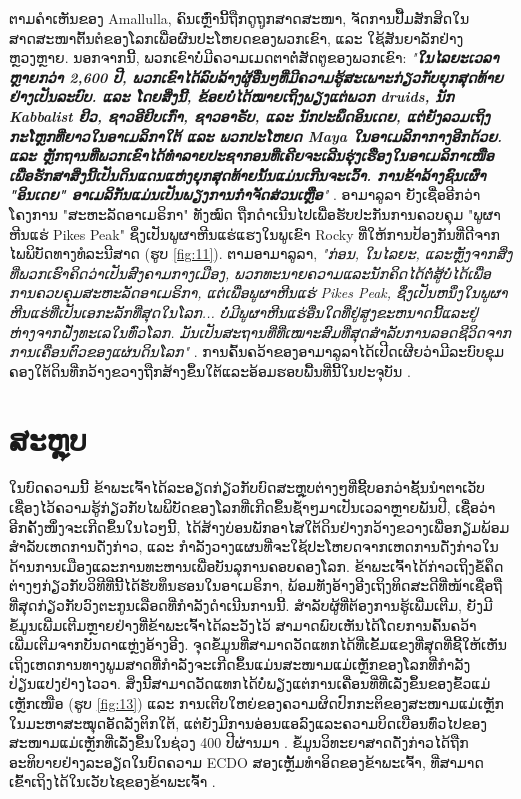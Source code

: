 \documentclass[10pt,twocolumn,letterpaper]{article}
\begin{document}
ຕາມຄຳເຫັນຂອງ Amallulla, ຄົນເຫຼົ່ານີ້ຖືກດູຖູກສາດສະໜາ, ຈັດການປື້ມສັກສິດໃນສາດສະໜາຕົ້ນຕໍຂອງໂລກເພື່ອຜົນປະໂຫຍດຂອງພວກເຂົາ, ແລະ ໃຊ້ສັນຍາລັກຢ່າງຫຼວງຫຼາຍ. ນອກຈາກນີ້, ພວກເຂົາບໍ່ມີຄວາມເມດຕາຕໍ່ສັດຕູຂອງພວກເຂົາ: \textit{"\textbf{ໃນໄລຍະເວລາຫຼາຍກວ່າ 2,600 ປີ, ພວກເຂົາໄດ້ລົບລ້າງຜູ້ອື່ນໆທີ່ມີຄວາມຮູ້ສະເພາະກ່ຽວກັບຍຸກສຸດທ້າຍຢ່າງເປັນລະບົບ. ແລະ ໂດຍສິ່ງນີ້, ຂ້ອຍບໍ່ໄດ້ໝາຍເຖິງພຽງແຕ່ພວກ druids, ນັກ Kabbalist ຢິວ, ຊາວອີຢິບເກົ່າ, ຊາວອາຣັບ, ແລະ ນັກປະພຶດອິນເດຍ, ແຕ່ຍັງລວມເຖິງກະໂຫຼກທີ່ຍາວໃນອາເມລິກາໃຕ້ ແລະ ພວກປະໂຫຍດ Maya ໃນອາເມລິກາກາງອີກດ້ວຍ. ແລະ ຫຼັກຖານທີ່ພວກເຂົາໄດ້ທຳລາຍປະຊາກອນທີ່ເຄີຍຈະເລີນຮຸ່ງເຮືອງໃນອາເມລິກາເໜືອເພື່ອຮັກສາສິ່ງນີ້ເປັນດິນແດນແຫ່ງຍຸກສຸດທ້າຍນັ້ນແມ່ນເກີນຈະເວົ້າ. ການຂ້າລ້າງຊົນເຜົ່າ "ອິນເດຍ" ອາເມລິກັນແມ່ນເປັນພຽງການກຳຈັດສ່ວນເຫຼືອ}"} \cite{33,34}.
ອາມາລູລາ ຍັງເຊື່ອອີກວ່າໂຄງການ "ສະຫະລັດອາເມຣິກາ" ທັງໝົດ ຖືກດຳເນີນໄປເພື່ອຮັບປະກັນການຄວບຄຸມ "ພູຜາຫີນແຮ່ Pikes Peak" ຊຶ່ງເປັນພູຜາຫີນແຮ່ແຮງໃນພູເຂົາ Rocky ທີ່ໃຫ້ການປ້ອງກັນທີ່ດີຈາກໄພພິບັດທາງທໍລະນີສາດ (ຮູບ \ref{fig:11}). ຕາມອາມາລູລາ, \textit{"ກ່ອນ, ໃນໄລຍະ, ແລະຫຼັງຈາກສິ່ງທີ່ພວກເຮົາຄິດວ່າເປັນສົງຄາມກາງເມືອງ, ພວກທະນາຍຄວາມແລະນັກຄິດໄດ້ຕໍ່ສູ້ບໍ່ໄດ້ເພື່ອການຄວບຄຸມສະຫະລັດອາເມຣິກາ, ແຕ່ເພື່ອພູຜາຫີນແຮ່ Pikes Peak, ຊຶ່ງເປັນຫນຶ່ງໃນພູຜາຫີນແຮ່ທີ່ເປັນເອກະລັກທີ່ສຸດໃນໂລກ... ບໍ່ມີພູຜາຫີນແຮ່ອື່ນໃດທີ່ຢູ່ສູງຂະຫນາດນີ້ແລະຢູ່ຫ່າງຈາກຝັ່ງທະເລໃນທົ່ວໂລກ. ມັນເປັນສະຖານທີ່ທີ່ເໝາະສົມທີ່ສຸດສຳລັບການລອດຊີວິດຈາກການເຄື່ອນຕົວຂອງແຜ່ນດິນໂລກ"} \cite{33,34}. ການຄົ້ນຄວ້າຂອງອາມາລູລາໄດ້ເປີດເຜີຍວ່າມີລະບົບຂຸມຄອງໃຕ້ດິນທີ່ກວ້າງຂວາງຖືກສ້າງຂຶ້ນໃຕ້ແລະອ້ອມຮອບພື້ນທີ່ນີ້ໃນປະຈຸບັນ \cite{36}.

\section{ສະຫຼຸບ}

ໃນບົດຄວາມນີ້ ຂ້າພະເຈົ້າໄດ້ລະອຽດກ່ຽວກັບບົດສະຫຼຸບຕ່າງໆທີ່ຊີ້ບອກວ່າຊັ້ນນຳຕາເວັບເຊື່ອງໄວ້ຄວາມຮູ້ກ່ຽວກັບໄພພິບັດຂອງໂລກທີ່ເກີດຂຶ້ນຊ້ຳໆມາເປັນເວລາຫຼາຍພັນປີ, ເຊື່ອວ່າອີກຄັ້ງໜຶ່ງຈະເກີດຂຶ້ນໃນໄວໆນີ້, ໄດ້ສ້າງບ່ອນພັກອາໄສໃຕ້ດິນຢ່າງກວ້າງຂວາງເພື່ອກຽມພ້ອມສຳລັບເຫດການດັ່ງກ່າວ, ແລະ ກຳລັງວາງແຜນທີ່ຈະໃຊ້ປະໂຫຍດຈາກເຫດການດັ່ງກ່າວໃນດ້ານການເມືອງແລະການທະຫານເພື່ອບັນລຸການຄອບຄອງໂລກ. ຂ້າພະເຈົ້າໄດ້ກ່າວເຖິງຂໍ້ຄຶດຕ່າງໆກ່ຽວກັບວິທີທີ່ນີ້ໄດ້ຮັບທຶນຮອນໃນອາເມຣິກາ, ພ້ອມທັງອ້າງອີງເຖິງທິດສະດີທີ່ໜ້າເຊື່ອຖືທີ່ສຸດກ່ຽວກັບວົງຕະກູນເລືອດທີ່ກຳລັງດຳເນີນການນີ້. ສຳລັບຜູ້ທີ່ຕ້ອງການຮູ້ເພີ່ມເຕີມ, ຍັງມີຂໍ້ມູນເພີ່ມເຕີມຫຼາຍຢ່າງທີ່ຂ້າພະເຈົ້າໄດ້ລະວັງໄວ້ ສາມາດພົບເຫັນໄດ້ໂດຍການຄົ້ນຄວ້າເພີ່ມເຕີມຈາກບັນດາແຫຼ່ງອ້າງອີງ.
ຈຸດຂໍ້ມູນທີ່ສາມາດວັດແທກໄດ້ທີ່ເຂັ້ມແຂງທີ່ສຸດທີ່ຊີ້ໃຫ້ເຫັນເຖິງເຫດການທາງພູມສາດທີ່ກຳລັງຈະເກີດຂຶ້ນແມ່ນສະໜາມແມ່ເຫຼັກຂອງໂລກທີ່ກຳລັງປ່ຽນແປງຢ່າງໄວວາ. ສິ່ງນີ້ສາມາດວັດແທກໄດ້ບໍ່ພຽງແຕ່ການເຄື່ອນທີ່ທີ່ເລັ່ງຂຶ້ນຂອງຂົ້ວແມ່ເຫຼັກເໜືອ (ຮູບ \ref{fig:13}) ແລະ ການເຕີບໃຫຍ່ຂອງຄວາມຜິດປົກກະຕິຂອງສະໜາມແມ່ເຫຼັກໃນມະຫາສະໝຸດອັດລັງຕິກໃຕ້, ແຕ່ຍັງມີການອ່ອນແອລົງແລະຄວາມບິດເບືອນທົ່ວໄປຂອງສະໜາມແມ່ເຫຼັກທີ່ເລັ່ງຂຶ້ນໃນຊ່ວງ 400 ປີຜ່ານມາ \cite{3}. ຂໍ້ມູນວິທະຍາສາດດັ່ງກ່າວໄດ້ຖືກອະທິບາຍຢ່າງລະອຽດໃນບົດຄວາມ ECDO ສອງເຫຼັ້ມທຳອິດຂອງຂ້າພະເຈົ້າ, ທີ່ສາມາດເຂົ້າເຖິງໄດ້ໃນເວັບໄຊຂອງຂ້າພະເຈົ້າ \cite{3}.
\end{document}
